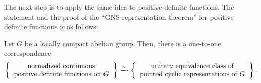 \documentclass{../../small}
\begin{document}
The next step is to apply the same idea to positive definite functions.
The statement and the proof of the ``GNS representation theorem'' for positive definite functions is as follows:

\begin{thm}
Let $G$ be a locally compact abelian group.
Then, there is a one-to-one correspondence
\[\left\{\begin{tabular}{c}normalized continuous\\positive definite functions on $G$\end{tabular}\right\}\xrightarrow{\sim}\left\{\begin{tabular}{c}unitary equivalence class of\\pointed cyclic representations of $G$\end{tabular}\right\}.\]
\end{thm}
\end{document}
